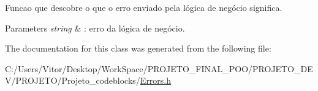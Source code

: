 Funcao que descobre o que o erro enviado pela lógica de negócio significa. 


\begin{DoxyParams}{Parameters}
{\em string} & \-: erro da lógica de negócio. \\
\hline
\end{DoxyParams}


The documentation for this class was generated from the following file\-:\begin{DoxyCompactItemize}
\item 
C\-:/\-Users/\-Vitor/\-Desktop/\-Work\-Space/\-P\-R\-O\-J\-E\-T\-O\-\_\-\-F\-I\-N\-A\-L\-\_\-\-P\-O\-O/\-P\-R\-O\-J\-E\-T\-O\-\_\-\-D\-E\-V/\-P\-R\-O\-J\-E\-T\-O/\-Projeto\-\_\-codeblocks/\hyperlink{_errors_8h}{Errors.\-h}\end{DoxyCompactItemize}
